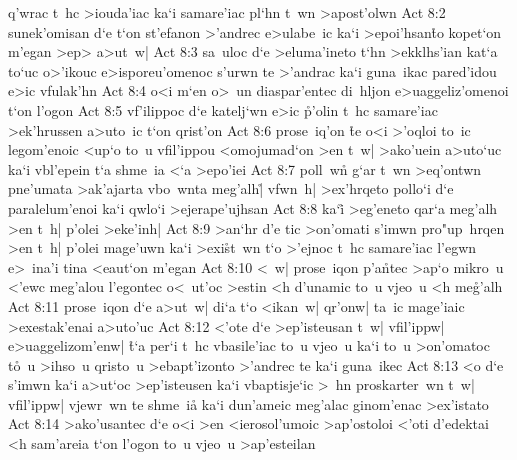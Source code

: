 q'wrac
t~hc
>iouda'iac
ka`i
samare'iac
pl`hn
t~wn
>apost'olwn\bibvsend
\vs Act 8:2
sunek'omisan
d`e
t`on
st'efanon
>'andrec
e>ulabe~ic
ka`i
>epoi'hsan\r{t}o
kopet`on
m'egan
>ep>
a>ut~w|\bibvsend
\vs Act 8:3
sa~uloc
d`e
>eluma'ineto
t`hn
>ekklhs'ian
kat`a
to`uc
o>'ikouc
e>isporeu'omenoc
s'urwn
te
>'andrac
ka`i
guna~ikac
pared'idou
e>ic
vfulak'hn\bibvsend
\vs Act 8:4
o<i
m`en
o>~un
diaspar'entec
di~hljon
e>uaggeliz'omenoi
t`on
l'ogon\bibvsend
\vs Act 8:5
vf'ilippoc
d`e
katelj`wn
e>ic
\r{p}'olin
t~hc
samare'iac
>ek'hrussen
a>uto~ic
t`on
qrist'on\bibvsend
\vs Act 8:6
prose~iq'on
\r{t}e
o<i
>'oqloi
to~ic
legom'enoic
<up`o
to~u
vfil'ippou
<omojumad`on
>en
t~w|
>ako'uein
a>uto`uc
ka`i
vbl'epein
t`a
shme~ia
<`a
>epo'iei\bibvsend
\vs Act 8:7
poll~w\r{n}
g`ar
t~wn
>eq'ontwn
pne'umata
>ak'ajarta
vbo~wnta
meg'alh|\r{}
vfwn~h|
>ex'hrqeto
pollo`i
d`e
paralelum'enoi
ka`i
qwlo`i
>ejerape'ujhsan\bibvsend
\vs Act 8:8
ka`i\r{}
>eg'eneto
qar`a
meg'alh
>en
t~h|
p'olei
>eke'inh|\bibvsend
\vs Act 8:9
>an`hr
d'e
tic
>on'omati
s'imwn
pro"up~hrqen
>en
t~h|
p'olei
mage'uwn
ka`i
>exi\r{s}t~wn
t`o
>'ejnoc
t~hc
samare'iac
l'egwn
e>~ina'i
tina
<eaut`on
m'egan\bibvsend
\vs Act 8:10
<~w|
prose~iqon
p'a\r{n}tec
>ap`o
mikro~u
<'ewc
meg'alou
l'egontec
o<~ut'oc
>estin
<h
d'unamic
to~u
vjeo~u
<h
me\r{g}'alh\bibvsend
{}
\vs Act 8:11
prose~iqon
d`e
a>ut~w|
di`a
t`o
<ikan~w|
qr'onw|
ta~ic
mage'iaic
>exestak'enai
a>uto'uc\bibvsend
\vs Act 8:12
<'ote
d`e
>ep'isteusan
t~w|
vfil'ippw|
e>uaggelizom'enw|
\r{t}`a
per`i
t~hc
vbasile'iac
to~u
vjeo~u
ka`i
to~u
>on'omatoc
t\r{o}~u
>ihso~u
qristo~u
>ebapt'izonto
>'andrec
te
ka`i
guna~ikec\bibvsend
\vs Act 8:13
<o
d`e
s'imwn
ka`i
a>ut`oc
>ep'isteusen
ka`i
vbaptisje`ic
>~hn
proskarter~wn
t~w|
vfil'ippw|
vjewr~wn
te
shme~ia\r{}
ka`i
dun'ameic
meg'alac
ginom'enac
>ex'istato\bibvsend
\vs Act 8:14
>ako'usantec
d`e
o<i
>en
<ierosol'umoic
>ap'ostoloi
<'oti
d'edektai
<h
sam'areia
t`on
l'ogon
to~u
vjeo~u
>ap'esteilan
